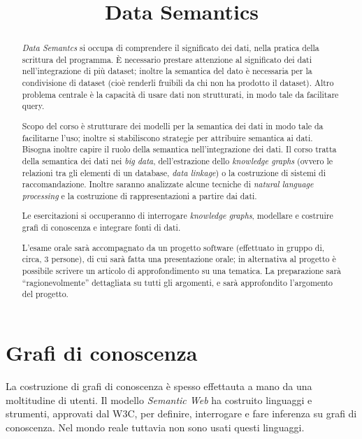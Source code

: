 \documentclass[11pt, twocolumn]{article}
\title{\textbf{Data Semantics}}
\author{}
\date{}
\begin{document}
\maketitle
\begin{abstract}
  \textit{Data Semantcs} si occupa di comprendere il significato dei dati, nella pratica della scrittura del programma.
  È necessario prestare attenzione al significato dei dati nell'integrazione di più dataset; inoltre la semantica del dato è necessaria per la condivisione di dataset (cioè renderli fruibili da chi non ha prodotto il dataset).
  Altro problema centrale è la capacità di usare dati non strutturati, in modo tale da facilitare query.
  
  Scopo del corso è strutturare dei modelli per la semantica dei dati in modo tale da facilitarne l'uso; inoltre si stabiliscono strategie per attribuire semantica ai dati.
  Bisogna inoltre capire il ruolo della semantica nell'integrazione dei dati.
  Il corso tratta della semantica dei dati nei \textit{big data}, dell'estrazione dello \textit{knowledge graphs} (ovvero le relazioni tra gli elementi di un database, \textit{data linkage}) o la costruzione di sistemi di raccomandazione.
  Inoltre saranno analizzate alcune tecniche di \textit{natural language processing} e la costruzione di rappresentazioni a partire dai dati.

  Le esercitazioni si occuperanno di interrogare \textit{knowledge graphs}, modellare e costruire grafi di conoscenza e integrare fonti di dati.

  L'esame orale sarà accompagnato da un progetto software (effettuato in gruppo di, circa, 3 persone), di cui sarà fatta una presentazione orale; in alternativa al progetto è possibile scrivere un articolo di approfondimento su una tematica.
  La preparazione sarà ``ragionevolmente'' dettagliata su tutti gli argomenti, e sarà approfondito l'argomento del progetto.
\end{abstract}


\newpage
\part{Grafi di conoscenza}
La costruzione di grafi di conoscenza è spesso effettauta a mano da una moltitudine di utenti.
Il modello \textit{Semantic Web} ha costruito linguaggi e strumenti, approvati dal W3C, per definire, interrogare e fare inferenza su grafi di conoscenza.
Nel mondo reale tuttavia non sono usati questi linguaggi.
\end{document}
